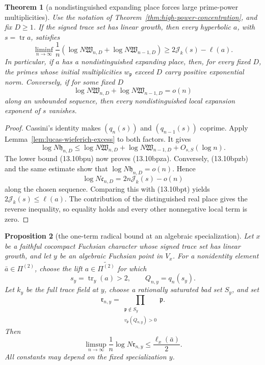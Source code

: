 \documentclass[11pt,reqno]{amsart}
\newtheorem{theorem}{Theorem}[section]
\newtheorem{proposition}[theorem]{Proposition}
\theoremstyle{definition}
\theoremstyle{remark}
\newcommand{\Tr}{\operatorname{tr}}
\begin{document}
\begin{theorem}[a nondistinguished expanding place forces large prime-power multiplicities]
\label{thm:wieferich-mass}
Use the notation of Theorem~\ref{thm:high-power-concentration}, and fix
\(D\ge1\).  If the signed trace set has linear growth, then every
hyperbolic \(a\), with \(s=\Tr a\), satisfies
\[
 \liminf_{n\to\infty}\frac1n
 \left(\log N\mathfrak W_{n,D}
       +\log N\mathfrak W_{n-1,D}\right)
 \ge 2\mathcal J_k(s)-\ell(a).
\tag{13.10bpza}
\]
In particular, if \(a\) has a nondistinguished expanding place, then, for
every fixed \(D\), the primes whose initial multiplicities
\(w_{\mathfrak p}\) exceed \(D\) carry positive exponential norm.
Conversely, if for some fixed \(D\)
\[
 \log N\mathfrak W_{n,D}
 +\log N\mathfrak W_{n-1,D}=o(n)
\tag{13.10bpzb}
\]
along an unbounded sequence, then every nondistinguished local expansion
exponent of \(s\) vanishes.
\end{theorem}

\begin{proof}
Cassini's identity makes \((q_n(s))\) and \((q_{n-1}(s))\) coprime.
Apply Lemma~\ref{lem:lucas-wieferich-excess} to both factors.  It gives
\[
 \log N\mathfrak h_{n,D}
 \le \log N\mathfrak W_{n,D}
    +\log N\mathfrak W_{n-1,D}+O_{s,S}(\log n).
\]
The lower bound (13.10bpu) now proves (13.10bpza).  Conversely,
(13.10bpzb) and the same estimate show that
\(\log N\mathfrak h_{n,D}=o(n)\).  Hence
\[
 \log N\mathfrak c_{n,D}
 =2n\mathcal J_k(s)-o(n)
\]
along the chosen sequence.  Comparing this with (13.10bpt) yields
\(2\mathcal J_k(s)\le\ell(a)\).  The contribution of the distinguished
real place gives the reverse inequality, so equality holds and every other nonnegative
local term is zero.
\end{proof}

\begin{proposition}[the one-term radical bound at an algebraic specialization]
\label{prop:fixed-ball-single-term-radical}
Let \(x\) be a faithful cocompact Fuchsian character whose signed trace
set has linear growth, and let \(y\) be an algebraic Fuchsian point in
\(V_x\).  For a nonidentity element \(\bar a\in\Pi^{(2)}\), choose the
lift \(a\in\widetilde{\Pi^{(2)}}\) for which
\[
 s_y=\Tr_y(a)>2,\qquad Q_{n,y}=q_n(s_y).
\]
Let \(k_y\) be the full trace field at \(y\), choose a rationally saturated
bad set \(S_y\), and set
\[
 \mathfrak r_{n,y}
 =\prod_{\substack{\mathfrak p\notin S_y\\
                    v_{\mathfrak p}(Q_{n,y})>0}}\mathfrak p .
\tag{13.10bpzc}
\]
Then
\[
 \limsup_{n\to\infty}\frac1n\log N\mathfrak r_{n,y}
 \le\frac{\ell_x(\bar a)}2.
\tag{13.10bpzcb}
\]
All constants may depend on the fixed specialization \(y\).
\end{proposition}
\end{document}
